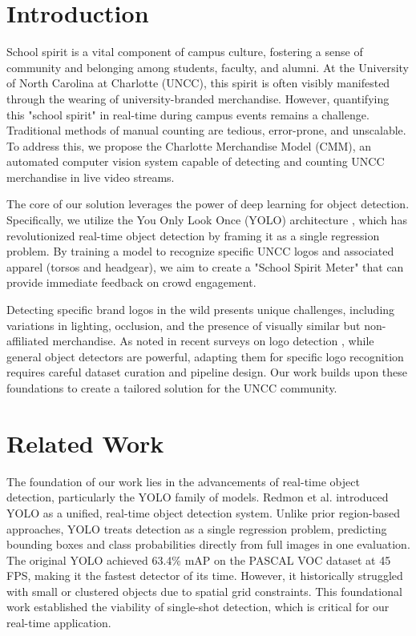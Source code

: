 \section{Introduction}
\label{sec:intro}

School spirit is a vital component of campus culture, fostering a sense of community and belonging among students, faculty, and alumni. At the University of North Carolina at Charlotte (UNCC), this spirit is often visibly manifested through the wearing of university-branded merchandise. However, quantifying this "school spirit" in real-time during campus events remains a challenge. Traditional methods of manual counting are tedious, error-prone, and unscalable. To address this, we propose the Charlotte Merchandise Model (CMM), an automated computer vision system capable of detecting and counting UNCC merchandise in live video streams.

The core of our solution leverages the power of deep learning for object detection. Specifically, we utilize the You Only Look Once (YOLO) architecture \cite{redmon2016you}, which has revolutionized real-time object detection by framing it as a single regression problem. By training a model to recognize specific UNCC logos and associated apparel (torsos and headgear), we aim to create a "School Spirit Meter" that can provide immediate feedback on crowd engagement.

Detecting specific brand logos in the wild presents unique challenges, including variations in lighting, occlusion, and the presence of visually similar but non-affiliated merchandise. As noted in recent surveys on logo detection \cite{hou2022deep}, while general object detectors are powerful, adapting them for specific logo recognition requires careful dataset curation and pipeline design. Our work builds upon these foundations to create a tailored solution for the UNCC community.

\section{Related Work}
\label{sec:related}

The foundation of our work lies in the advancements of real-time object detection, particularly the YOLO family of models. Redmon et al. introduced YOLO \cite{redmon2016you} as a unified, real-time object detection system. Unlike prior region-based approaches, YOLO treats detection as a single regression problem, predicting bounding boxes and class probabilities directly from full images in one evaluation. The original YOLO achieved 63.4\% mAP on the PASCAL VOC dataset at 45 FPS, making it the fastest detector of its time. However, it historically struggled with small or clustered objects due to spatial grid constraints. This foundational work established the viability of single-shot detection, which is critical for our real-time application.

